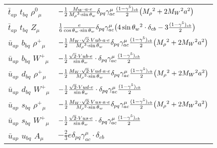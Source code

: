 \begin{center}
\begin{tabular}{|l|l|}
$\bar{t}{}_{a p }$ \phantom{-} $t{}_{b q }$ \phantom{-} $\rho^0{}_{\mu }$ \phantom{-}  &
	$-\frac{1}{2}\frac{ M_W \cdot a \cdot e}{ M_\rho{}^3  \cdot \sin{\theta}_w}\delta_{p q} \gamma_{a c}^\mu {(1-\gamma^5)_{c b}\over 2} \big( M_\rho{}^2 +2 M_W{}^2  a{}^2 \big)$\\[2mm]
$\bar{t}{}_{a p }$ \phantom{-} $t{}_{b q }$ \phantom{-} ${Z}_{\mu }$ \phantom{-}  &
	$\frac{1}{6}\frac{ e}{ \cos{\theta}_w \cdot \sin{\theta}_w}\delta_{p q} \gamma_{a c}^\mu \big(4 \sin{\theta}_w{}^2 \cdot \delta_{c b} -3{(1-\gamma^5)_{c b}\over 2} \big)$\\[2mm]
$\bar{u}{}_{a p }$ \phantom{-} $b{}_{b q }$ \phantom{-} $\rho^+{}_{\mu }$ \phantom{-}  &
	$-\frac{1}{2}\frac{ M_W \cdot\sqrt{2} \cdot Vub \cdot a \cdot e}{ M_\rho{}^3  \cdot \sin{\theta}_w}\delta_{p q} \gamma_{a c}^\mu {(1-\gamma^5)_{c b}\over 2} \big( M_\rho{}^2 +2 M_W{}^2  a{}^2 \big)$\\[2mm]
$\bar{u}{}_{a p }$ \phantom{-} $b{}_{b q }$ \phantom{-} $W^+{}_{\mu }$ \phantom{-}  &
	$-\frac{1}{2}\frac{\sqrt{2} \cdot Vub \cdot e}{ \sin{\theta}_w}\cdot \delta_{p q} \gamma_{a c}^\mu {(1-\gamma^5)_{c b}\over 2} $\\[2mm]
$\bar{u}{}_{a p }$ \phantom{-} $d{}_{b q }$ \phantom{-} $\rho^+{}_{\mu }$ \phantom{-}  &
	$-\frac{1}{2}\frac{ M_W \cdot\sqrt{2} \cdot Vud \cdot a \cdot e}{ M_\rho{}^3  \cdot \sin{\theta}_w}\delta_{p q} \gamma_{a c}^\mu {(1-\gamma^5)_{c b}\over 2} \big( M_\rho{}^2 +2 M_W{}^2  a{}^2 \big)$\\[2mm]
$\bar{u}{}_{a p }$ \phantom{-} $d{}_{b q }$ \phantom{-} $W^+{}_{\mu }$ \phantom{-}  &
	$-\frac{1}{2}\frac{\sqrt{2} \cdot Vud \cdot e}{ \sin{\theta}_w}\cdot \delta_{p q} \gamma_{a c}^\mu {(1-\gamma^5)_{c b}\over 2} $\\[2mm]
$\bar{u}{}_{a p }$ \phantom{-} $s{}_{b q }$ \phantom{-} $\rho^+{}_{\mu }$ \phantom{-}  &
	$-\frac{1}{2}\frac{ M_W \cdot\sqrt{2} \cdot Vus \cdot a \cdot e}{ M_\rho{}^3  \cdot \sin{\theta}_w}\delta_{p q} \gamma_{a c}^\mu {(1-\gamma^5)_{c b}\over 2} \big( M_\rho{}^2 +2 M_W{}^2  a{}^2 \big)$\\[2mm]
$\bar{u}{}_{a p }$ \phantom{-} $s{}_{b q }$ \phantom{-} $W^+{}_{\mu }$ \phantom{-}  &
	$-\frac{1}{2}\frac{\sqrt{2} \cdot Vus \cdot e}{ \sin{\theta}_w}\cdot \delta_{p q} \gamma_{a c}^\mu {(1-\gamma^5)_{c b}\over 2} $\\[2mm]
$\bar{u}{}_{a p }$ \phantom{-} $u{}_{b q }$ \phantom{-} ${A}_{\mu }$ \phantom{-}  &
	$-\frac{2}{3} e\delta_{p q} \gamma_{a c}^\mu \cdot \delta_{c b} $\\[2mm]

\end{tabular}
\end{center}
